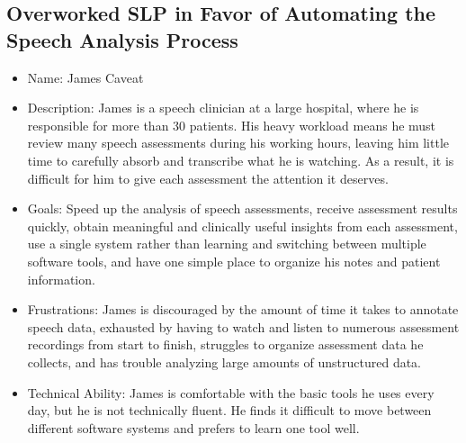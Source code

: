 \documentclass[12pt]{article}
\begin{document}
\subsection{Overworked SLP in Favor of Automating the Speech Analysis Process}
\begin{itemize}
\item Name: James Caveat
\item Description: James is a speech clinician at a large hospital, where he is responsible for more than 30 patients. His heavy workload means he must review many speech assessments during his working hours, leaving him little time to carefully absorb and transcribe what he is watching. As a result, it is difficult for him to give each assessment the attention it deserves.
\item Goals: Speed up the analysis of speech assessments, receive assessment results quickly, obtain meaningful and clinically useful insights from each assessment, use a single system rather than learning and switching between multiple software tools, and have one simple place to organize his notes and patient information.
\item Frustrations: James is discouraged by the amount of time it takes to annotate speech data, exhausted by having to watch and listen to numerous assessment recordings from start to finish, struggles to organize assessment data he collects, and has trouble analyzing large amounts of unstructured data.
\item Technical Ability: James is comfortable with the basic tools he uses every day, but he is not technically fluent. He finds it difficult to move between different software systems and prefers to learn one tool well.
\end{itemize}
\end{document}
